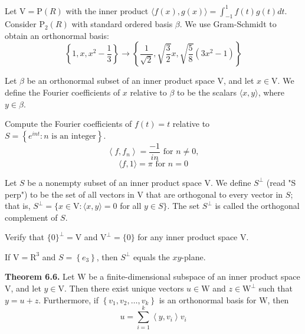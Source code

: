\documentclass{report}
\begin{document}
    \begin{Example}
        Let $\mathrm{V}=\mathrm{P}(R)$ with the inner product $\langle f(x), g(x)\rangle=\int_{-1}^{1} f(t) g(t) d t$. Consider $\mathrm{P}_{2}(R)$ with standard ordered basis $\beta$. We use Gram-Schmidt to obtain an orthonormal basis:
        $$
        \left\{1, x, x^{2}-\frac{1}{3}\right\} \rightarrow \left\{\frac{1}{\sqrt{2}}, \sqrt{\frac{3}{2}} x, \sqrt{\frac{5}{8}}(3 x^{2}-1)\right\}
        $$
    \end{Example}

    \begin{defBox}
        Let $\beta$ be an orthonormal subset of an inner product space $\mathrm{V}$, and let $x \in \mathrm{V}$. We define the Fourier coefficients of $x$ relative to $\beta$ to be the scalars $\langle x, y\rangle$, where $y \in \beta$.
    \end{defBox}

    \begin{Example}
        Compute the Fourier coefficients of $f(t)=t$ relative to $S=\left\{e^{int}: n \text{ is an integer}\right\}$.
        $$
        \left\langle f, f_{n}\right\rangle=\frac{-1}{i n} \text{ for } n \neq 0,
        $$
        $$
        \langle f, 1\rangle=\pi \text{ for } n=0
        $$
    \end{Example}

    \begin{defBox}
        Let $S$ be a nonempty subset of an inner product space V. We define $S^{\perp}$ (read "S perp") to be the set of all vectors in $\mathrm{V}$ that are orthogonal to every vector in $S$; that is, $S^{\perp}=\{x \in \mathrm{V}:\langle x, y\rangle=0$ for all $y \in S\}$. The set $S^{\perp}$ is called the orthogonal complement of $S$.
    \end{defBox}

    \begin{Example}
        Verify that $\{0\}^{\perp}=\mathrm{V}$ and $\mathrm{V}^{\perp}=\{0\}$ for any inner product space $\mathrm{V}$.
    \end{Example}

    \begin{Example}
        If $\mathrm{V}=\mathrm{R}^{3}$ and $S=\left\{e_{3}\right\}$, then $S^{\perp}$ equals the $xy$-plane.
    \end{Example}

    \begin{thBox}
        \textbf{Theorem 6.6.} Let $\mathrm{W}$ be a finite-dimensional subspace of an inner product space $\mathrm{V}$, and let $y \in \mathrm{V}$. Then there exist unique vectors $u \in \mathrm{W}$ and $z \in \mathrm{W}^{\perp}$ such that $y = u + z$. Furthermore, if $\left\{v_{1}, v_{2}, \ldots, v_{k}\right\}$ is an orthonormal basis for $\mathrm{W}$, then
        $$
        u = \sum_{i=1}^{k}\left\langle y, v_{i}\right\rangle v_{i}
        $$
    \end{thBox}
\end{document}

